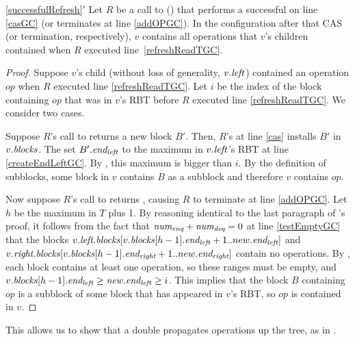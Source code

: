 \begin{customlemma}{\ref{successfulRefresh}$'$}
\label{successfulRefreshGC}
Let $R$ be a call to () that performs a successful  on line \ref{casGC} (or terminates at line \ref{addOPGC}).
In the configuration after that CAS (or termination, respectively), $v$ contains all operations that $v$'s children contained 
when $R$ executed line~\ref{refreshReadTGC}.
\end{customlemma}
\begin{proof}
Suppose $v$'s child (without loss of generality, $v.\mbox{\textit{left}}$) contained an operation $op$ 
when $R$ executed line \ref{refreshReadTGC}.
Let $i$ be the index of the block containing $op$ that was in $v$'s RBT before 
$R$ executed line \ref{refreshReadTGC}.
We consider two cases.

Suppose $R$'s call to  returns a new block $B'$.  Then, $R$'s  at line \ref{cas} 
installs $B'$ in $v.\mbox{\textit{blocks}}$.
The  set $B'.\mbox{\textit{end\textsubscript{left}}}$ to the maximum  in $v.\mbox{\textit{left}}$'s RBT at line \ref{createEndLeftGC}.
By , this maximum  is bigger than $i$.
By the definition of subblocks, some block in $v$ contains $B$ as a subblock
and therefore $v$ contains $op$.

Now suppose $R$'s call to  returns \nl, causing $R$ to terminate at line \ref{addOPGC}.
Let $h$ be the maximum  in $T$ plus 1.
By reasoning identical to the last paragraph of 's proof,
it follows from the fact that $\mbox{\textnormal{\textit{num\textsubscript{enq}}}}+\mbox{\textnormal{\textit{num\textsubscript{deq}}}}=0$ at line \ref{testEmptyGC}
that the blocks $v.\mbox{\textit{left.blocks}}[v.\mbox{\textit{blocks}}[h-1].\mbox{\textit{end\textsubscript{left}}}+1..new.\mbox{\textit{end\textsubscript{left}}}]$ and
$v.\mbox{\textit{right.blocks}}[v.\mbox{\textit{blocks}}[h-1].\mbox{\textit{end\textsubscript{right}}}+1..new.\mbox{\textit{end\textsubscript{right}}}]$
contain no operations.
By , each block contains at least one operation, so
these ranges must be empty, and $v.\mbox{\textit{blocks}}[h-1].\mbox{\textit{end\textsubscript{left}}} \geq \mbox{\textnormal{\textit{new}}}.\mbox{\textit{end\textsubscript{left}}}\geq i$.
This implies that the block $B$ containing $op$ is a subblock of some block that has appeared
in $v$'s RBT, so $op$ is contained in $v$.
\end{proof}

This allows us to show that a double  propagates operations up the tree, 
as in .

